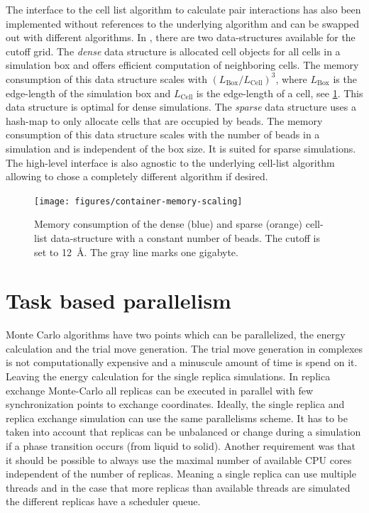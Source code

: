 \documentclass[12pt, twoside]{report}
\begin{document}
The interface to the cell list algorithm to calculate pair interactions has also
been implemented without references to the underlying algorithm and can be
swapped out with different algorithms. In \complexes, there are two
data-structures available for the cutoff grid. The \textit{dense} data structure
is allocated cell objects for all cells in a simulation box and offers efficient
computation of neighboring cells. The memory consumption of this data structure
scales with \((L_{\mathrm{Box}}/L_{\mathrm{Cell}})^3\), where
\(L_{\mathrm{Box}}\) is the edge-length of the simulation box and
\(L_{\mathrm{Cell}}\) is the edge-length of a cell, see
\cref{fig:container-memory-scaling}. This data structure is optimal for dense
simulations. The \textit{sparse} data structure uses a hash-map to only allocate
cells that are occupied by beads. The memory consumption of this data structure
scales with the number of beads in a simulation and is independent of the box
size. It is suited for sparse simulations. The high-level interface is also
agnostic to the underlying cell-list algorithm allowing to chose a completely
different algorithm if desired.
\begin{figure}[!ht]
  \centering
  \texttt{[image: figures/container-memory-scaling]}
  \caption{Memory consumption of the dense (blue) and sparse (orange) cell-list
    data-structure with a constant number of beads. The cutoff is set to
    \SI{12}{\AA}. The gray line marks one gigabyte.}
\label{fig:container-memory-scaling}
\end{figure}

\section{Task based parallelism}

Monte Carlo algorithms have two points which can be parallelized, the energy
calculation and the trial move generation. The trial move generation in
complexes is not computationally expensive and a minuscule amount of time is
spend on it. Leaving the energy calculation for the single replica simulations.
In replica exchange Monte-Carlo all replicas can be executed in parallel with
few synchronization points to exchange coordinates. Ideally, the single replica
and replica exchange simulation can use the same parallelisms scheme. It has to
be taken into account that replicas can be unbalanced or change during a
simulation if a phase transition occurs (from liquid to solid). Another
requirement was that it should be possible to always use the maximal number of
available \gls{CPU} cores independent of the number of replicas. Meaning a
single replica can use multiple threads and in the case that more replicas than
available threads are simulated the different replicas have a scheduler queue.
\end{document}
